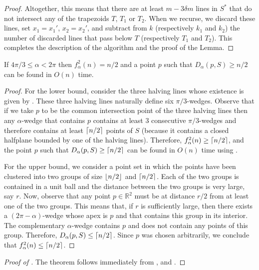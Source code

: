 \documentclass[lotsofwhite]{patmorin}
\begin{document}
\begin{proof}
Altogether, this means that there are at least $m-3\delta m$ lines in
$S^*$ that do not intersect any of the trapezoids $T$, $T_1$ or $T_2$.
When we recurse, we discard these lines, set $x_1=x_1'$, $x_2=x_2'$,
and subtract from $k$ (respectively $k_1$ and $k_2$) the number of
discarded lines that pass below $T$ (respectively $T_1$ and $T_2$).
This completes the description of the algorithm and the proof of the
Lemma.
\end{proof}

\begin{lem}
If $4\pi/3\le \alpha < 2\pi$ then $f^2_\alpha(n) = n/2$ and a point
$p$ such that $D_\alpha(p,S)\ge n/2$ can be found in $O(n)$ time.
\end{lem}

\begin{proof}
For the lower bound, consider the three halving lines whose existence
is given by .  These three halving lines
naturally define six $\pi/3$-wedges.  Observe that if we take $p$ to
be the common intersection point of the three halving lines then any
$\alpha$-wedge that contains $p$ contains at least 3 consecutive
$\pi/3$-wedges and therefore contains at least $\left\lceil n/2 \right\rceil$ points of $S$
(because it contains a closed halfplane bounded by one of the
halving lines).  Therefore, $f^2_\alpha(n)\ge \left\lceil n/2 \right\rceil$, and the
point $p$ such that $D_\alpha(p,S)\ge \left\lceil n/2 \right\rceil$ can be found in $O(n)$
time using .

 
For the upper bound, we consider a point set in which the points have
been clustered into two groups of size $\left\lfloor n/2 \right\rfloor$ and $\left\lceil n/2 \right\rceil$.
Each of the two groups is contained in a unit ball and the distance
between the two groups is very large, say $r$.  Now, observe that any
point $p\in\mathbb{R}^2$ must be at distance $r/2$ from at least one
of the two groups.  This means that, if $r$ is sufficiently large,
then there exists a $(2\pi-\alpha)$-wedge whose apex is $p$ and that
contains this group in its interior.  The complementary $\alpha$-wedge
contains $p$ and does not contain any points of this group.
Therefore, $D_\alpha(p,S)\le \left\lceil n/2 \right\rceil$.  Since $p$ was chosen
arbitrarily, we conclude that $f^2_\alpha(n)\le \left\lceil n/2 \right\rceil$.
\end{proof}

\begin{proof}[Proof of ] 
The theorem follows immediately from , 
and .
\end{proof}
\end{document}
